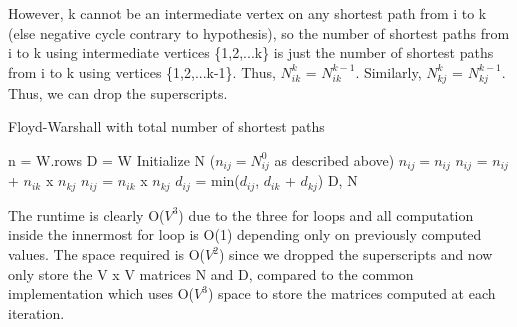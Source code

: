 \documentclass[11pt,a4paper]{article}
\begin{document}
However, k cannot be an intermediate vertex on any shortest path from i to k (else negative cycle contrary to hypothesis), so the number of shortest paths from i to k using intermediate vertices \{1,2,...k\} is just the number of shortest paths from i to k using vertices \{1,2,...k-1\}. Thus, $N_{ik}^{k}$ = $N_{ik}^{k-1}$. Similarly, $N_{kj}^{k}$ = $N_{kj}^{k-1}$. Thus, we can drop the superscripts.


\begin{algorithm}
\caption{Floyd-Warshall with total number of shortest paths}
\begin{algorithmic}[1]
 \State n = W.rows
 \State D = W
 \State Initialize N ($n_{ij} = N_{ij}^{0}$ as described above)
 				\State $n_{ij} = n_{ij}$
 				\State $n_{ij}$ = $n_{ij}$ + $n_{ik}$ x $n_{kj}$
 			\Else
 				\State $n_{ij}$ = $n_{ik}$ x $n_{kj}$
 			\EndIf
 			\State $d_{ij}$ = min($d_{ij}$, $d_{ik}$ + $d_{kj}$)
 		\EndFor
 	\EndFor
 \EndFor
 \State \Return D, N
\EndFunction
\end{algorithmic}
\end{algorithm}

The runtime is clearly O($V^{3}$) due to the three for loops and all computation inside the innermost for loop is O(1) depending only on previously computed values. The space required is O($V^2$) since we dropped the superscripts and now only store the V x V matrices N and D, compared to the common implementation which uses O($V^3$) space to store the matrices computed at each iteration.
\end{document}
